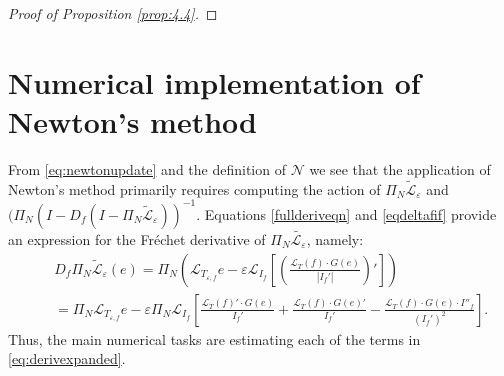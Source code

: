 \documentclass[12pt]{article}
\def\L{\mathcal{L}}
\newcommand{\eps}{\varepsilon}
\theoremstyle{plain}
\begin{document}
{\begin{proof}[Proof of Proposition \ref{prop:4.4}]
 
\end{proof}



\section{Numerical implementation of Newton's method}\label{sec:num}



From \eqref{eq:newtonupdate} and the definition of $\mathcal{N}$ we see that the application of Newton's method primarily requires computing the action of $\Pi_N\tilde{\L}_{\eps}$ and $(\Pi_N(I-D_f(I-\Pi_N\tilde{\L}_{\eps}))^{-1}$.
Equations \eqref{fullderiveqn} and \eqref{eqdeltafif} provide an expression for the Fr\'echet derivative of $\Pi_N\tilde{\L_\eps}$, namely:
\begin{eqnarray} 
&&\nonumber D_f\Pi_N\tilde{\mathcal L}_\eps(e)=\Pi_N\left(\L_{T_{\eps,f}}e -\eps\L_{I_f}\left[\left(\frac{\L_{T}(f)\cdot G(e)}{|I_{f}'|}\right)'\right]\right)\\
\label{eq:derivexpanded}&&=\Pi_N\L_{T_{\eps,f}}e -\eps \Pi_N\L_{I_f}\left[\frac{\L_{T}(f)'\cdot G(e)}{I_{f}'} + \frac{\L_{T}(f)\cdot G(e)'}{I_{f}'} - \frac{\L_{T}(f)\cdot G(e)\cdot I''_f}{(I_{f}')^2}\right].
\end{eqnarray}
Thus, the main numerical tasks are estimating each of the terms in \eqref{eq:derivexpanded}.

}
\end{document}
